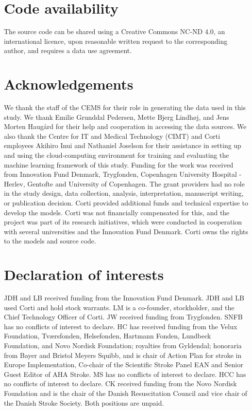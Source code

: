 {\section*{Code availability}

The source code can be shared using a Creative Commons NC-ND 4.0, an international licence, upon reasonable written request to the corresponding author, and requires a data use agreement. 


\section*{Acknowledgements}

We thank the staff of the CEMS for their role in generating the data used in this study. We thank Emilie Grunddal Pedersen, Mette Bjerg Lindhøj, and Jens Morten Haugård for their help and cooperation in accessing the data sources. We also thank the Centre for IT and Medical Technology (CIMT) and Corti employees Akihiro Inui and Nathaniel Joselson for their assistance in setting up and using the cloud-computing environment for training and evaluating the machine learning framework of this study. Funding for the work was received from Innovation Fund Denmark, Trygfonden, Copenhagen University Hospital - Herlev, Gentofte and University of Copenhagen. The grant providers had no role in the study design, data collection, analysis, interpretation, manuscript writing, or publication decision. Corti provided additional funds and technical expertise to develop the models. Corti was not financially compensated for this, and the project was part of its research initiatives, which were conducted in cooperation with several universities and the Innovation Fund Denmark. Corti owns the rights to the models and source code.

\section*{Declaration of interests}

JDH and LB received funding from the Innovation Fund Denmark. JDH and LB used Corti and hold stock warrants. LM is a co-founder, stockholder, and the Chief Technology Officer of Corti. JW received funding from Trygfonden. SNFB has no conflicts of interest to declare. HC has received funding from the Velux Foundation, Tværsfonden, Helsefonden, Hartmann Fonden, Lundbeck Foundation, and Novo Nordisk Foundation; royalties from Gyldendal; honoraria from Bayer and Bristol Meyers Squibb, and is chair of Action Plan for stroke in Europe Implementation, Co-chair of the Scientific Stroke Panel EAN and Senior Guest Editor of AHA Stroke. MS has no conflicts of interest to declare. HCC has no conflicts of interest to declare. CK received funding from the Novo Nordisk Foundation and is the chair of the Danish Resuscitation Council and vice chair of the Danish Stroke Society. Both positions are unpaid.


}

